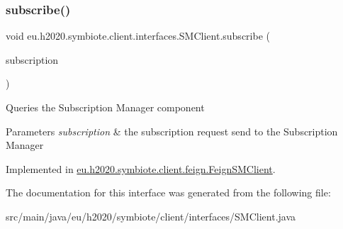 \mbox{\label{interfaceeu_1_1h2020_1_1symbiote_1_1client_1_1interfaces_1_1SMClient_ac9e9feeade418ab9df8e3bbed2f31d0b}} 
\subsubsection{\texorpdfstring{subscribe()}{subscribe()}}
{\footnotesize\ttfamily void eu.\+h2020.\+symbiote.\+client.\+interfaces.\+S\+M\+Client.\+subscribe (\begin{DoxyParamCaption}\item[{\hyperlink{classeu_1_1h2020_1_1symbiote_1_1cloud_1_1model_1_1internal_1_1Subscription}{Subscription}}]{subscription }\end{DoxyParamCaption})}

Queries the Subscription Manager component


\begin{DoxyParams}{Parameters}
{\em subscription} & the subscription request send to the Subscription Manager \\
\hline
\end{DoxyParams}


Implemented in \hyperlink{classeu_1_1h2020_1_1symbiote_1_1client_1_1feign_1_1FeignSMClient_a0eeaef7f9775704b578f5d3101f28b1f}{eu.\+h2020.\+symbiote.\+client.\+feign.\+Feign\+S\+M\+Client}.



The documentation for this interface was generated from the following file\+:\begin{DoxyCompactItemize}
\item 
src/main/java/eu/h2020/symbiote/client/interfaces/S\+M\+Client.\+java\end{DoxyCompactItemize}
